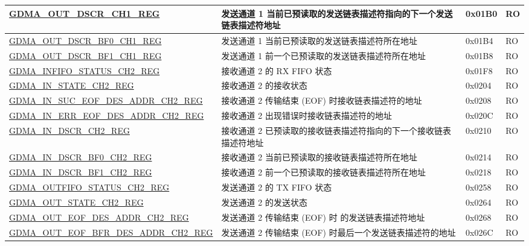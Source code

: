 \begin{longtable}{ | p{6cm} | p{7.2cm} | p{1.3cm} | p{1cm} | }
\hyperref[regdesc:GDMAOUTDSCRCHNREG]{GDMA\_OUT\_DSCR\_CH1\_REG} & 发送通道 1  当前已预读取的发送链表描述符指向的下一个发送链表描述符地址 & 0x01B0 & RO \\ \hline
\hyperref[regdesc:GDMAOUTDSCRBF0CHNREG]{GDMA\_OUT\_DSCR\_BF0\_CH1\_REG} &  发送通道 1 当前已预读取的发送链表描述符所在地址 & 0x01B4 & RO \\ \hline
\hyperref[regdesc:GDMAOUTDSCRBF1CHNREG]{GDMA\_OUT\_DSCR\_BF1\_CH1\_REG} & 发送通道 1 前一个已预读取的发送链表描述符所在地址 & 0x01B8 & RO \\ \hline
\hyperref[regdesc:GDMAINFIFOSTATUSCHNREG]{GDMA\_INFIFO\_STATUS\_CH2\_REG} & 接收通道 2 的 RX FIFO 状态 & 0x01F8 & RO \\ \hline
\hyperref[regdesc:GDMAINSTATECHNREG]{GDMA\_IN\_STATE\_CH2\_REG} & 接收通道 2 的接收状态 & 0x0204 & RO \\ \hline
\hyperref[regdesc:GDMAINSUCEOFDESADDRCHNREG]{GDMA\_IN\_SUC\_EOF\_DES\_ADDR\_CH2\newline\_REG} & 接收通道 2 传输结束 (EOF) 时接收链表描述符的地址 & 0x0208 & RO \\ \hline
\hyperref[regdesc:GDMAINERREOFDESADDRCHNREG]{GDMA\_IN\_ERR\_EOF\_DES\_ADDR\_CH2\newline\_REG} & 接收通道 2 出现错误时接收链表描述符的地址 & 0x020C & RO \\ \hline
\hyperref[regdesc:GDMAINDSCRCHNREG]{GDMA\_IN\_DSCR\_CH2\_REG} & 接收通道 2 已预读取的接收链表描述符指向的下一个接收链表描述符地址 & 0x0210 & RO \\ \hline
\hyperref[regdesc:GDMAINDSCRBF0CHNREG]{GDMA\_IN\_DSCR\_BF0\_CH2\_REG} &  接收通道 2 当前已预读取的接收链表描述符所在地址 & 0x0214 & RO \\ \hline
\hyperref[regdesc:GDMAINDSCRBF1CHNREG]{GDMA\_IN\_DSCR\_BF1\_CH2\_REG} & 接收通道 2 前一个已预读取的接收链表描述符所在地址 & 0x0218 & RO \\ \hline
\hyperref[regdesc:GDMAOUTFIFOSTATUSCHNREG]{GDMA\_OUTFIFO\_STATUS\_CH2\_REG} & 发送通道 2 的 TX FIFO 状态 & 0x0258 & RO \\ \hline
\hyperref[regdesc:GDMAOUTSTATECHNREG]{GDMA\_OUT\_STATE\_CH2\_REG} & 发送通道 2 的发送状态 & 0x0264 & RO \\ \hline
\hyperref[regdesc:GDMAOUTEOFDESADDRCHNREG]{GDMA\_OUT\_EOF\_DES\_ADDR\_CH2\newline\_REG} & 发送通道 2 传输结束 (EOF) 时 的发送链表描述符地址 & 0x0268 & RO \\ \hline
\hyperref[regdesc:GDMAOUTEOFBFRDESADDRCHNREG]{GDMA\_OUT\_EOF\_BFR\_DES\_ADDR\_CH2\newline\_REG} & 发送通道 2 传输结束 (EOF) 时最后一个发送链表描述符的地址 & 0x026C & RO \\ \hline

\end{longtable}
